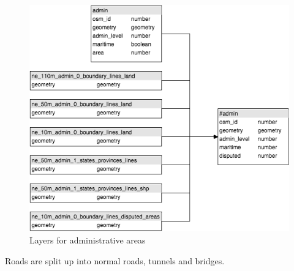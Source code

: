\begin{figure}[h]
  \centering
  \includegraphics[scale=0.6]{images/admin_layer.png}
  \caption{Layers for administrative areas}
\end{figure}

\newpage
Roads are split up into normal roads, tunnels and bridges.

